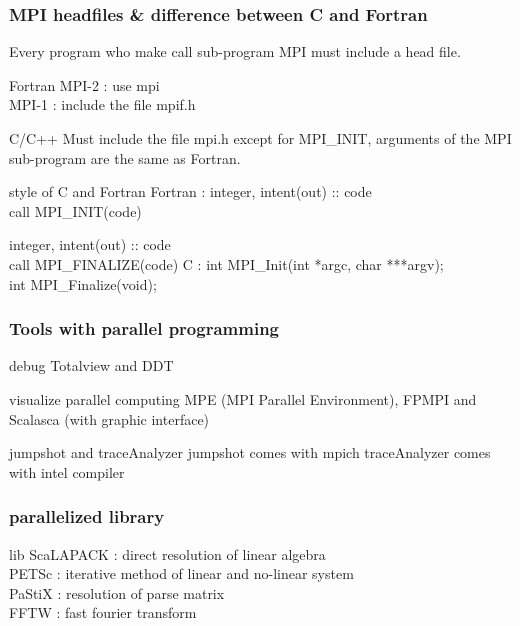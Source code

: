 \documentclass{beamer}
\begin{document}
\begin{frame}
	\frametitle{MPI headfiles \& difference between C and Fortran}

	Every program who make call sub-program MPI must include a head file.
\begin{block}{Fortran}
	MPI-2 : use mpi	\\
	MPI-1 : include the file mpif.h
\end{block}
\begin{block}{C/C++}
	Must include the file mpi.h
	except for MPI\_INIT, arguments of the MPI sub-program are the same as Fortran.
\end{block}

\begin{block}{style of C and Fortran}
	Fortran :
	integer, intent(out) :: code \\
	call MPI\_INIT(code) 

	integer, intent(out) :: code \\
	call MPI\_FINALIZE(code) 
	C : 
	int MPI\_Init(int *argc, char ***argv); \\
	int MPI\_Finalize(void);
\end{block}
	
\end{frame}

\begin{frame}
\frametitle{Tools with parallel programming}
\begin{block}{debug}
Totalview and DDT
\end{block}

\begin{block}{visualize parallel computing}
MPE (MPI Parallel Environment), FPMPI and Scalasca (with graphic interface)
\end{block}

\begin{block}{jumpshot and traceAnalyzer}
		jumpshot comes with mpich
		traceAnalyzer comes with intel compiler
\end{block}

\end{frame}

\begin{frame}
\frametitle{parallelized library}
\begin{block}{lib}
ScaLAPACK : direct resolution of linear algebra \\
PETSc     : iterative method of linear and no-linear system \\
PaStiX    : resolution of parse matrix \\
FFTW      : fast fourier transform 
\end{block}

\end{frame}
\end{document}
